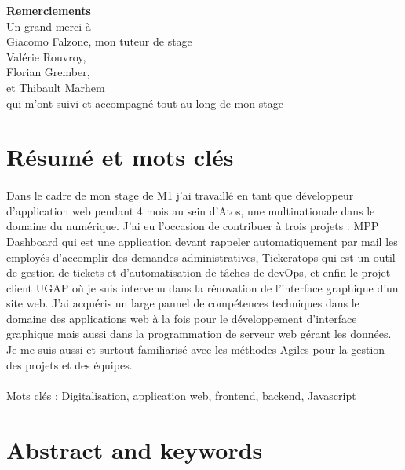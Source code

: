 \documentclass[12pt]{article}
\begin{document}
\begin {sloppypar}
\newpage 

\begin{center}
  \LARGE
  \textbf{Remerciements}
  \vspace{5cm}\\
  \normalsize
  Un grand merci à\\ 
  Giacomo Falzone, mon tuteur de stage\\
  Valérie Rouvroy, \\
  Florian Grember, \\
  et Thibault Marhem \\
  qui m'ont suivi et accompagné tout au long de mon stage
\end{center}
\newpage

\def\contentsname{Sommaires}
\tableofcontents
\newpage

\renewcommand{\listfigurename}{Table des matières des illustrations}
\listoffigures
\newpage

\section*{Résumé et mots clés}
\paragraph{}
Dans le cadre de mon stage de M1 j'ai travaillé en tant que développeur d'application 
web pendant 4 mois au sein d'Atos, une multinationale dans le domaine du numérique. 
J'ai eu l'occasion de contribuer à trois projets : MPP Dashboard qui est une application 
devant rappeler automatiquement par mail les employés d'accomplir des demandes administratives, 
Tickeratops qui est un outil de gestion de tickets et d'automatisation de tâches de devOps, et enfin 
le projet client UGAP où je suis intervenu dans la rénovation de l'interface graphique d'un site web. 
J'ai acquéris un large pannel de compétences techniques dans le domaine des applications web à la fois 
pour le développement d'interface graphique mais aussi dans la programmation de serveur web gérant les données.
Je me suis aussi et surtout familiarisé avec les méthodes Agiles pour la gestion des projets et des équipes.
\paragraph{}
Mots clés : Digitalisation, application web, frontend, backend, Javascript
\newpage

\section*{Abstract and keywords}

\end{sloppypar}
\end{document}
